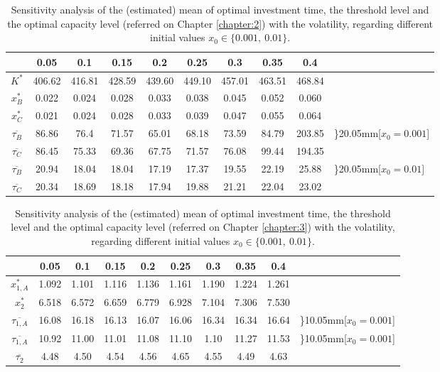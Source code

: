 \begin{table}[!ht]
	\centering
	\caption{Sensitivity analysis of the (estimated) mean of optimal investment time, the threshold level and the optimal capacity level (referred on Chapter \ref{chapter:2}) with the volatility, regarding different initial values $x_0 \in \{0.001, \ 0.01\}$.}
	\begin{tabular}{c|ccccccccl}
		\hline
		\text{ $\sigma $ } & 0.05 & 0.1 & 0.15 & 0.2 & 0.25 & 0.3 & 0.35 & 0.4 \\ \hline
		$K^*$ & 406.62 & 416.81 & 428.59 & 439.60 & 449.10 & 457.01 & 463.51 & 468.84  \\
		$x_B^*$ & 0.022 & 0.024 & 0.028 & 0.033 & 0.038 & 0.045 & 0.052 & 0.060  \\
		$x_C^*$ & 0.021 & 0.024 & 0.028 & 0.033 & 0.039 & 0.047 & 0.055 & 0.064 \\ \hline
		$\overline{\tau _B}$ & 86.86 & 76.4 & 71.57 & 65.01 & 68.18 & 73.59 & 84.79 & 203.85  & \rdelim\}{2}{0.05mm}[$x_0=0.001$]  \\
		$\overline{\tau _C}$ & 86.45 & 75.33 & 69.36 & 67.75 & 71.57 & 76.08 & 99.44 & 194.35 \\ \hline
		$\overline{\tau _B}$ & 20.94 & 18.04 & 18.04 & 17.19 & 17.37 & 19.55 & 22.19 & 25.88  &	\rdelim\}{2}{0.05mm}[$x_0=0.01$] \\
		$\overline{\tau _C}$ & 20.34 & 18.69 & 18.18 & 17.94 & 19.88 & 21.21 & 22.04 & 23.02  \\ \hline
	\end{tabular}
	\label{tab:vol_2}
\end{table}


\begin{table}[!htb]
	\centering
	\caption{Sensitivity analysis of the (estimated) mean of optimal investment time, the threshold level and the optimal capacity level (referred on Chapter \ref{chapter:3}) with the volatility, regarding different initial values $x_0 \in \{0.001, \ 0.01\}$.}
	\begin{tabular}{c|ccccccccc}
		\hline
		\text{ $\sigma $ } & 0.05 & 0.1 & 0.15 & 0.2 & 0.25 & 0.3 & 0.35 & 0.4 \\ \hline
		$x_{1,A}^*$ & 1.092 & 1.101 & 1.116 & 1.136 & 1.161 & 1.190 & 1.224 & 1.261   \\
		$x_2^*$ & 6.518 & 6.572 & 6.659 & 6.779 & 6.928 & 7.104 & 7.306 & 7.530  \\ \hline
		$\overline{\tau _{1,A}}$ & 16.08 & 16.18 & 16.13 & 16.07 & 16.06 & 16.34 & 16.34 & 16.64  & \rdelim\}{1}{0.05mm}[$x_0=0.001$] \\
		$\overline{\tau _{1,A}}$ & 10.92 & 11.00 & 11.01 &  11.08 & 11.10 & 1.10 & 11.27 & 11.53 & \rdelim\}{1}{0.05mm}[$x_0=0.001$]  \\ \hline
		$\overline{\tau _2}$ & 4.48 & 4.50 & 4.54 & 4.56 & 4.65 & 4.55 & 4.49 & 4.63   \\ \hline
	\end{tabular}
	\label{tab:vol_3}
\end{table}

